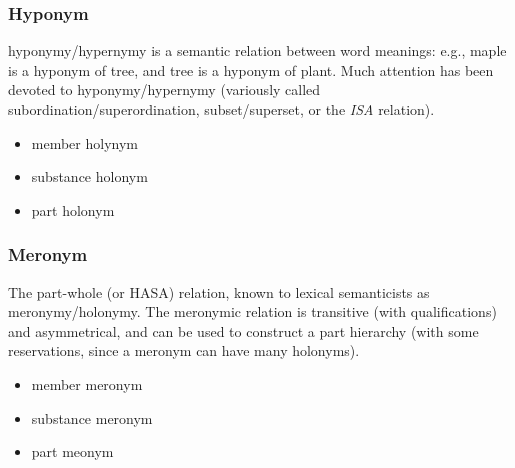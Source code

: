 \subsubsection{Hyponym}
hyponymy/hypernymy is a semantic relation between word meanings: e.g., {maple} is a hyponym of {tree}, and {tree} is a hyponym of {plant}. Much attention has been devoted to hyponymy/hypernymy (variously called subordination/superordination, subset/superset, or the \emph{ISA} relation).

\begin{itemize}
\item member holynym
\item substance holonym
\item part holonym
\end{itemize}



\subsubsection{Meronym}
The part-whole (or HASA) relation, known to lexical semanticists as meronymy/holonymy.   The meronymic relation is transitive (with qualifications) and asymmetrical, and can be used to construct a part hierarchy (with some reservations, since a meronym can have many holonyms).
\begin{itemize}
\item member meronym
\item substance meronym
\item part meonym
\end{itemize}


